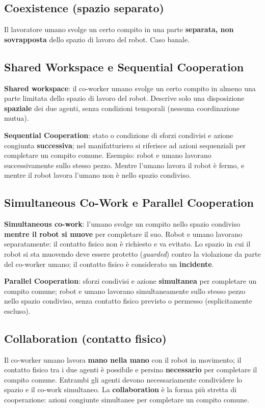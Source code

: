 \subsection{Coexistence (spazio separato)}
Il lavoratore umano svolge un certo compito in una parte \textbf{separata, non sovrapposta} dello spazio di lavoro del robot. Caso banale.

\subsection{Shared Workspace e Sequential Cooperation}
\textbf{Shared workspace}: il co-worker umano svolge un certo compito in almeno una parte limitata dello spazio di lavoro del robot. Descrive solo una disposizione \textbf{spaziale} dei due agenti, senza condizioni temporali (nessuna coordinazione mutua).

\textbf{Sequential Cooperation}: stato o condizione di sforzi condivisi e azione congiunta \textbf{successiva}; nel manifatturiero si riferisce ad azioni sequenziali per completare un compito comune. Esempio: robot e umano lavorano successivamente sullo stesso pezzo. Mentre l'umano lavora il robot è fermo, e mentre il robot lavora l'umano non è nello spazio condiviso.

\subsection{Simultaneous Co-Work e Parallel Cooperation}
\textbf{Simultaneous co-work}: l'umano svolge un compito nello spazio condiviso \textbf{mentre il robot si muove} per completare il suo. Robot e umano lavorano separatamente: il contatto fisico non è richiesto e va evitato. Lo spazio in cui il robot si sta muovendo deve essere protetto (\emph{guarded}) contro la violazione da parte del co-worker umano; il contatto fisico è considerato un \textbf{incidente}.

\textbf{Parallel Cooperation}: sforzi condivisi e azione \textbf{simultanea} per completare un compito comune; robot e umano lavorano simultaneamente sullo stesso pezzo nello spazio condiviso, senza contatto fisico previsto o permesso (esplicitamente escluso).

\subsection{Collaboration (contatto fisico)}
Il co-worker umano lavora \textbf{mano nella mano} con il robot in movimento; il contatto fisico tra i due agenti è possibile e persino \textbf{necessario} per completare il compito comune. Entrambi gli agenti devono necessariamente condividere lo spazio e il co-work simultaneo. La \textbf{collaboration} è la forma più stretta di cooperazione: azioni congiunte simultanee per completare un compito comune.

